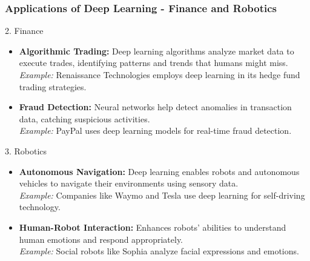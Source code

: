 \documentclass[aspectratio=169]{beamer}
\begin{document}
\begin{frame}[fragile]
    \frametitle{Applications of Deep Learning - Finance and Robotics}
    \begin{block}{2. Finance}
        \begin{itemize}
            \item \textbf{Algorithmic Trading:}
                Deep learning algorithms analyze market data to execute trades, identifying patterns and trends that humans might miss.
                \\ \textit{Example:} Renaissance Technologies employs deep learning in its hedge fund trading strategies.
            \item \textbf{Fraud Detection:}
                Neural networks help detect anomalies in transaction data, catching suspicious activities.
                \\ \textit{Example:} PayPal uses deep learning models for real-time fraud detection.
        \end{itemize}
    \end{block}

    \begin{block}{3. Robotics}
        \begin{itemize}
            \item \textbf{Autonomous Navigation:}
                Deep learning enables robots and autonomous vehicles to navigate their environments using sensory data.
                \\ \textit{Example:} Companies like Waymo and Tesla use deep learning for self-driving technology.
            \item \textbf{Human-Robot Interaction:}
                Enhances robots' abilities to understand human emotions and respond appropriately.
                \\ \textit{Example:} Social robots like Sophia analyze facial expressions and emotions.
        \end{itemize}
    \end{block}
\end{frame}
\end{document}
